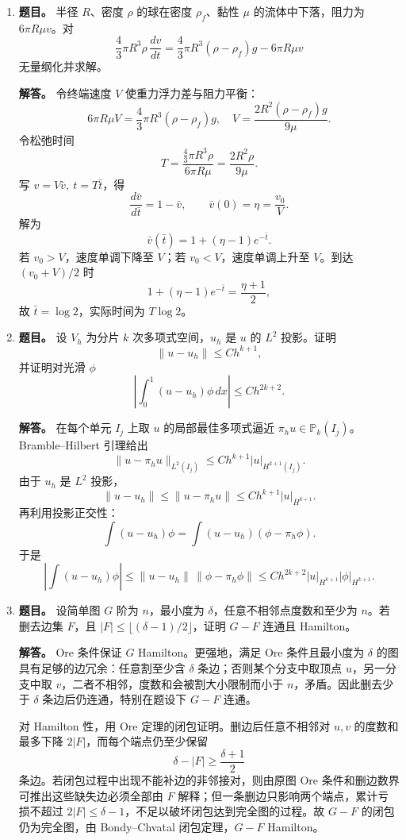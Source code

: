 ﻿\documentclass[UTF8,12pt]{ctexart}
\begin{document}
\begin{enumerate}[label=\textbf{\arabic*.},leftmargin=2.2em]
\item \textbf{题目。} 半径 \(R\)、密度 \(\rho\) 的球在密度 \(\rho_f\)、黏性 \(\mu\) 的流体中下落，阻力为 \(6\pi R\mu v\)。对
\[
\frac43\pi R^3\rho\,\frac{dv}{dt}
=\frac43\pi R^3(\rho-\rho_f)g-6\pi R\mu v
\]
无量纲化并求解。

\textbf{解答。} 令终端速度 \(V\) 使重力浮力差与阻力平衡：
\[
6\pi R\mu V=\frac43\pi R^3(\rho-\rho_f)g,
\quad
V=\frac{2R^2(\rho-\rho_f)g}{9\mu}.
\]
令松弛时间
\[
T=\frac{\frac43\pi R^3\rho}{6\pi R\mu}
=\frac{2R^2\rho}{9\mu}.
\]
写 \(v=V\bar v,\ t=T\bar t\)，得
\[
\frac{d\bar v}{d\bar t}=1-\bar v,\qquad
\bar v(0)=\eta=\frac{v_0}{V}.
\]
解为
\[
\bar v(\bar t)=1+(\eta-1)e^{-\bar t}.
\]
若 \(v_0>V\)，速度单调下降至 \(V\)；若 \(v_0<V\)，速度单调上升至 \(V\)。到达 \((v_0+V)/2\) 时
\[
1+(\eta-1)e^{-\bar t}=\frac{\eta+1}{2},
\]
故 \(\bar t=\log2\)，实际时间为 \(T\log2\)。

\item \textbf{题目。} 设 \(V_h\) 为分片 \(k\) 次多项式空间，\(u_h\) 是 \(u\) 的 \(L^2\) 投影。证明
\[
\|u-u_h\|\le Ch^{k+1},
\]
并证明对光滑 \(\phi\)
\[
\left|\int_0^1 (u-u_h)\phi\,dx\right|\le Ch^{2k+2}.
\]

\textbf{解答。} 在每个单元 \(I_j\) 上取 \(u\) 的局部最佳多项式逼近 \(\pi_hu\in\mathbb P_k(I_j)\)。Bramble--Hilbert 引理给出
\[
\|u-\pi_hu\|_{L^2(I_j)}\le Ch^{k+1}|u|_{H^{k+1}(I_j)}.
\]
由于 \(u_h\) 是 \(L^2\) 投影，
\[
\|u-u_h\|\le\|u-\pi_hu\|\le Ch^{k+1}|u|_{H^{k+1}}.
\]
再利用投影正交性：
\[
\int (u-u_h)\phi=\int (u-u_h)(\phi-\pi_h\phi).
\]
于是
\[
\left|\int (u-u_h)\phi\right|
\le \|u-u_h\|\,\|\phi-\pi_h\phi\|
\le Ch^{2k+2}|u|_{H^{k+1}}|\phi|_{H^{k+1}}.
\]

\item \textbf{题目。} 设简单图 \(G\) 阶为 \(n\)，最小度为 \(\delta\)，任意不相邻点度数和至少为 \(n\)。若删去边集 \(F\)，且 \(|F|\le\lfloor(\delta-1)/2\rfloor\)，证明 \(G-F\) 连通且 Hamilton。

\textbf{解答。} Ore 条件保证 \(G\) Hamilton。更强地，满足 Ore 条件且最小度为 \(\delta\) 的图具有足够的边冗余：任意割至少含 \(\delta\) 条边；否则某个分支中取顶点 \(u\)，另一分支中取 \(v\)，二者不相邻，度数和会被割大小限制而小于 \(n\)，矛盾。因此删去少于 \(\delta\) 条边后仍连通，特别在题设下 \(G-F\) 连通。

对 Hamilton 性，用 Ore 定理的闭包证明。删边后任意不相邻对 \(u,v\) 的度数和最多下降 \(2|F|\)，而每个端点仍至少保留
\[
\delta-|F|\ge \frac{\delta+1}{2}
\]
条边。若闭包过程中出现不能补边的非邻接对，则由原图 Ore 条件和删边数界可推出这些缺失边必须全部由 \(F\) 解释；但一条删边只影响两个端点，累计亏损不超过 \(2|F|\le\delta-1\)，不足以破坏闭包达到完全图的过程。故 \(G-F\) 的闭包仍为完全图，由 Bondy--Chvatal 闭包定理，\(G-F\) Hamilton。


\end{enumerate}
\end{document}
